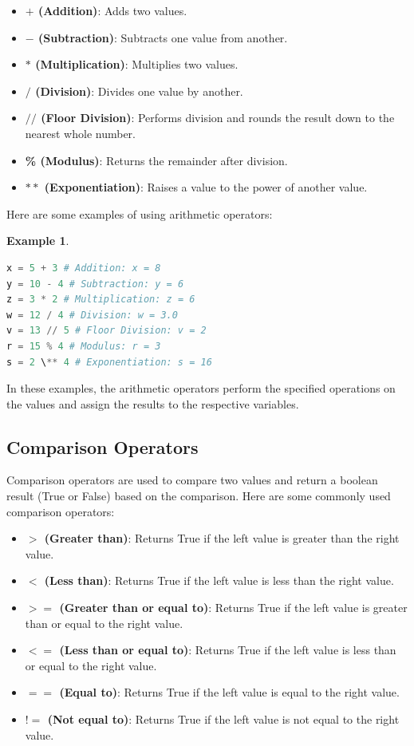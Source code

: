 \documentclass[12pt]{article}
\newtheorem{Example}{Example}[section]
\begin{document}
\begin{itemize}
\item \textbf{$+$ (Addition)}: Adds two values.
\item \textbf{$-$ (Subtraction)}: Subtracts one value from another.
\item \textbf{$*$ (Multiplication)}: Multiplies two values.
\item \textbf{$/$ (Division)}: Divides one value by another.
\item \textbf{$//$ (Floor Division)}: Performs division and rounds the result down to the nearest whole number.
\item \textbf{\% (Modulus)}: Returns the remainder after division.
\item \textbf{$**$ (Exponentiation)}: Raises a value to the power of another value.
\end{itemize}

Here are some examples of using arithmetic operators:

\begin{Example}
\begin{lstlisting}[language=Python]
x = 5 + 3 # Addition: x = 8
y = 10 - 4 # Subtraction: y = 6
z = 3 * 2 # Multiplication: z = 6
w = 12 / 4 # Division: w = 3.0
v = 13 // 5 # Floor Division: v = 2
r = 15 % 4 # Modulus: r = 3
s = 2 \** 4 # Exponentiation: s = 16
\end{lstlisting}
\end{Example}

In these examples, the arithmetic operators perform the specified operations on the values and assign the results to the respective variables.


\subsection{Comparison Operators}

Comparison operators are used to compare two values and return a boolean result (True or False) based on the comparison. Here are some commonly used comparison operators:

\begin{itemize}
\item \textbf{$>$ (Greater than)}: Returns True if the left value is greater than the right value.
\item \textbf{$<$ (Less than)}: Returns True if the left value is less than the right value.
\item \textbf{$>=$ (Greater than or equal to)}: Returns True if the left value is greater than or equal to the right value.
\item \textbf{$<=$ (Less than or equal to)}: Returns True if the left value is less than or equal to the right value.
\item \textbf{$==$ (Equal to)}: Returns True if the left value is equal to the right value.
\item \textbf{$!=$ (Not equal to)}: Returns True if the left value is not equal to the right value.
\end{itemize}
\end{document}
